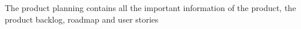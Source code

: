 The product planning contains all the important information of the product, the product backlog, roadmap and user stories

